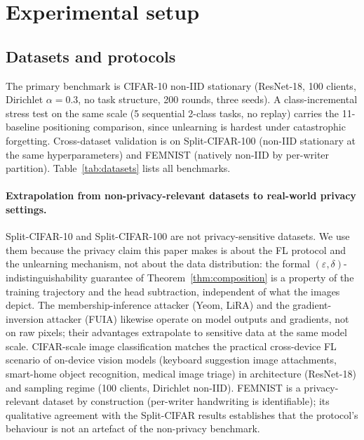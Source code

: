\section{Experimental setup}
\label{sec:experiments}

\subsection{Datasets and protocols}
\label{sec:experiments-datasets}

The primary benchmark is CIFAR-10 non-IID stationary (ResNet-18, 100 clients,
Dirichlet $\alpha{=}0.3$, no task structure, 200 rounds, three seeds). A
class-incremental stress test on the same scale (5 sequential 2-class tasks, no
replay) carries the 11-baseline positioning comparison, since unlearning is
hardest under catastrophic forgetting. Cross-dataset validation is on
Split-CIFAR-100 (non-IID stationary at the same hyperparameters) and FEMNIST
(natively non-IID by per-writer partition). Table~\ref{tab:datasets} lists all
benchmarks.

\paragraph{Extrapolation from non-privacy-relevant datasets to real-world privacy
settings.}
Split-CIFAR-10 and Split-CIFAR-100 are not privacy-sensitive datasets. We use them
because the privacy claim this paper makes is about the FL protocol and the
unlearning mechanism, not about the data distribution: the formal
$(\varepsilon, \delta)$-indistinguishability guarantee of
Theorem~\ref{thm:composition} is a property of the training trajectory and the head
subtraction, independent of what the images depict. The membership-inference
attacker (Yeom, LiRA) and the gradient-inversion attacker (FUIA) likewise operate
on model outputs and gradients, not on raw pixels; their advantages extrapolate to
sensitive data at the same model scale. CIFAR-scale image classification matches
the practical cross-device FL scenario of on-device vision models (keyboard
suggestion image attachments, smart-home object recognition, medical image triage)
in architecture (ResNet-18) and sampling regime (100 clients, Dirichlet
non-IID). FEMNIST is a privacy-relevant dataset by construction (per-writer
handwriting is identifiable); its qualitative agreement with the Split-CIFAR
results establishes that the protocol's behaviour is not an artefact of the
non-privacy benchmark.

